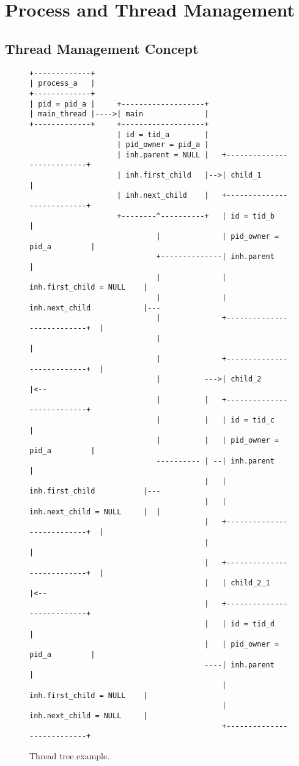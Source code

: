 \part{Process and Thread Management}

\chapter{Thread Management Concept}

\begin{figure}
\begin{verbatim}
+-------------+
| process_a   |
+-------------+
| pid = pid_a |     +-------------------+
| main_thread |---->| main              |
+-------------+     +-------------------+
                    | id = tid_a        |
                    | pid_owner = pid_a |
                    | inh.parent = NULL |   +---------------------------+
                    | inh.first_child   |-->| child_1                   |
                    | inh.next_child    |   +---------------------------+
                    +--------^----------+   | id = tid_b                |
                             |              | pid_owner = pid_a         |
                             +--------------| inh.parent                |
                             |              | inh.first_child = NULL    |
                             |              | inh.next_child            |---
                             |              +---------------------------+  |
                             |                                             |
                             |              +---------------------------+  |
                             |          --->| child_2                   |<--
                             |          |   +---------------------------+
                             |          |   | id = tid_c                |
                             |          |   | pid_owner = pid_a         |
                             ---------- | --| inh.parent                |
                                        |   | inh.first_child           |---
                                        |   | inh.next_child = NULL     |  |
                                        |   +---------------------------+  |
                                        |                                  |
                                        |   +---------------------------+  |
                                        |   | child_2_1                 |<--
                                        |   +---------------------------+
                                        |   | id = tid_d                |
                                        |   | pid_owner = pid_a         |
                                        ----| inh.parent                |
                                            | inh.first_child = NULL    |
                                            | inh.next_child = NULL     |
                                            +---------------------------+
\end{verbatim}
\caption{Thread tree example.}
\label{figure:thtree}
\end{figure}

